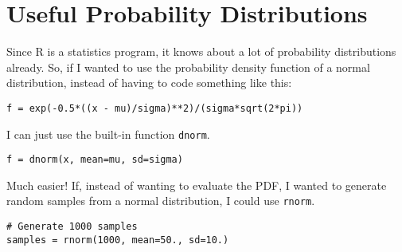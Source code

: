 \section{Useful Probability Distributions}
Since R is a statistics program, it knows about a lot of probability
distributions already. So, if I wanted to use the probability density function
of a normal distribution, instead of having to code something like this:
\begin{verbatim}
f = exp(-0.5*((x - mu)/sigma)**2)/(sigma*sqrt(2*pi))
\end{verbatim}
I can just use the built-in function {\tt dnorm}.
\begin{verbatim}
f = dnorm(x, mean=mu, sd=sigma)
\end{verbatim}
Much easier! If, instead of wanting to evaluate the PDF, I wanted to generate
random samples from a normal distribution, I could use {\tt rnorm}.
\begin{verbatim}
# Generate 1000 samples
samples = rnorm(1000, mean=50., sd=10.)
\end{verbatim}

